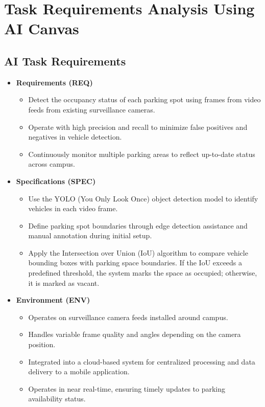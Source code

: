 \clearpage
\section{Task Requirements Analysis Using AI Canvas}
\label{section:task-requirement-analysis-using-ai-canvas}
\subsection{AI Task Requirements}
\label{subsection:ai-task-requirement}
\begin{itemize}
  \item \textbf{Requirements (REQ)}
  \begin{itemize}
    \item Detect the occupancy status of each parking spot using frames from video feeds from existing surveillance cameras.
    \item Operate with high precision and recall to minimize false positives and negatives in vehicle detection.
    \item Continuously monitor multiple parking areas to reflect up-to-date status across campus.
  \end{itemize}
  \item \textbf{Specifications (SPEC)}
  \begin{itemize}
    \item Use the YOLO (You Only Look Once) object detection model to identify vehicles in each video frame.
    \item Define parking spot boundaries through edge detection assistance and manual annotation during initial setup.
    \item Apply the Intersection over Union (IoU) algorithm to compare vehicle bounding boxes with parking space boundaries. If the IoU exceeds a predefined threshold, the system marks the space as occupied; otherwise, it is marked as vacant.
  \end{itemize}
  \item \textbf{Environment (ENV)}
  \begin{itemize}
    \item Operates on surveillance camera feeds installed around campus.
    \item Handles variable frame quality and angles depending on the camera position.
    \item Integrated into a cloud-based system for centralized processing and data delivery to a mobile application.
    \item Operates in near real-time, ensuring timely updates to parking availability status.
  \end{itemize}
\end{itemize}


